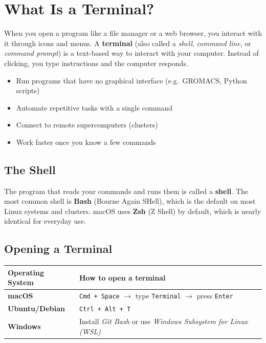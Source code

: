 \documentclass[12pt,a4paper]{article}
\newcommand{\defbox}[2]{%
  \begin{tcolorbox}[defstyle, title={#1}]
    #2
  \end{tcolorbox}
}
\begin{document}
\section{What Is a Terminal?}

When you open a program like a file manager or a web browser, you interact with
it through icons and menus. A \textbf{terminal} (also called a \emph{shell},
\emph{command line}, or \emph{command prompt}) is a text-based way to interact
with your computer. Instead of clicking, you type instructions and the computer
responds.

\defbox{Why scientists use the terminal}{
  \begin{itemize}[noitemsep]
    \item Run programs that have no graphical interface (e.g.\ GROMACS, Python scripts)
    \item Automate repetitive tasks with a single command
    \item Connect to remote supercomputers (clusters)
    \item Work faster once you know a few commands
  \end{itemize}
}

\subsection{The Shell}

The program that reads your commands and runs them is called a \textbf{shell}.
The most common shell is \textbf{Bash} (Bourne Again SHell), which is the
default on most Linux systems and clusters. macOS uses \textbf{Zsh} (Z Shell)
by default, which is nearly identical for everyday use.

\subsection{Opening a Terminal}

\begin{center}
\begin{tabular}{>{\bfseries}lp{9cm}}
\toprule
Operating System & How to open a terminal \\
\midrule
macOS & \texttt{Cmd + Space} $\to$ type \texttt{Terminal} $\to$ press \texttt{Enter} \\
Ubuntu/Debian & \texttt{Ctrl + Alt + T} \\
Windows & Install \textit{Git Bash} or use \textit{Windows Subsystem for Linux (WSL)} \\
\bottomrule
\end{tabular}
\end{center}
\end{document}
